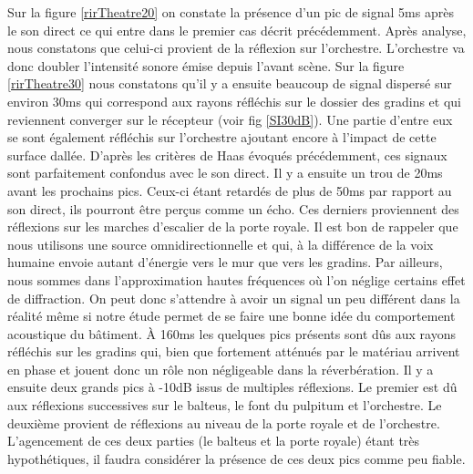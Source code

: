 Sur la figure \ref{rirTheatre20} on constate la présence d'un pic de signal 5ms après le son direct ce qui entre dans le premier cas décrit précédemment. Après analyse, nous constatons que celui-ci provient de la réflexion sur l'orchestre. L'orchestre va donc doubler l'intensité sonore émise depuis l'avant scène. Sur la figure \ref{rirTheatre30} nous constatons qu'il y a ensuite beaucoup de signal dispersé sur environ 30ms qui correspond aux rayons réfléchis sur le dossier des gradins et qui reviennent converger sur le récepteur (voir fig \ref{SI30dB}). Une partie d'entre eux se sont également réfléchis sur l'orchestre ajoutant encore à l'impact de cette surface dallée. D'après les critères de Haas évoqués précédemment, ces signaux sont parfaitement confondus avec le son direct. Il y a ensuite un trou de 20ms avant les prochains pics. Ceux-ci étant retardés de plus de 50ms par rapport au son direct, ils pourront être perçus comme un écho. Ces derniers proviennent des réflexions sur les marches d'escalier de la porte royale. Il est bon de rappeler que nous utilisons une source omnidirectionnelle et qui, à la différence de la voix humaine envoie autant d'énergie vers le mur que vers les gradins. Par ailleurs, nous sommes dans l'approximation hautes fréquences où l'on néglige certains effet de diffraction. On peut donc s'attendre à avoir un signal un peu différent dans la réalité même si notre étude permet de se faire une bonne idée du comportement acoustique du bâtiment. À 160ms les quelques pics présents sont dûs aux rayons réfléchis sur les gradins qui, bien que fortement atténués par le matériau arrivent en phase et jouent donc un rôle non négligeable dans la réverbération. Il y a ensuite deux grands pics à -10dB issus de multiples réflexions. Le premier est dû aux réflexions successives sur le \gls{balteus}, le font du \gls{pulpitum} et l'orchestre. Le deuxième provient de réflexions au niveau de la porte royale et de l'orchestre. L'agencement de ces deux parties (le \gls{balteus} et la porte royale) étant très hypothétiques, il faudra considérer la présence de ces deux pics comme peu fiable.
%
